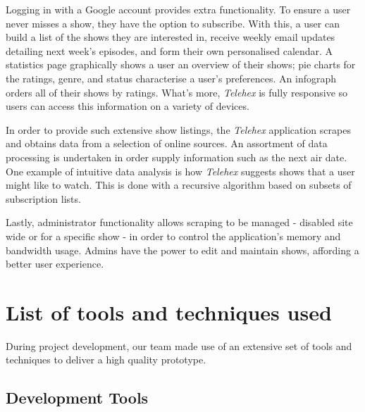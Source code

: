 \documentclass[12pt, a4paper]{article}
\begin{document}
Logging in with a Google account provides extra functionality. To ensure a user never misses a show, they have the option to subscribe. With this, a user can build a list of the shows they are interested in, receive weekly email updates detailing next week's episodes, and form their own personalised calendar. A statistics page graphically shows a user an overview of their shows; pie charts for the ratings, genre, and status characterise a user's preferences. An infograph orders all of their shows by ratings.  What's more, \textit{Telehex} is fully responsive so users can access this information on a variety of devices. 

In order to provide such extensive show listings, the \textit{Telehex} application scrapes and obtains data from a selection of online sources. An assortment of data processing is undertaken in order supply information such as the next air date. One example of intuitive data analysis is how \textit{Telehex} suggests shows that a user might like to watch. This is done with a recursive algorithm based on subsets of subscription lists. 

Lastly, administrator functionality allows scraping to be managed - disabled site wide or for a specific show - in order to control the application's memory and bandwidth usage. Admins have the power to edit and maintain shows, affording a better user experience.
\newpage
\section{List of tools and techniques used}

During project development, our team made use of an extensive set of tools and techniques to deliver a high quality prototype.

\subsection{Development Tools}
\end{document}
